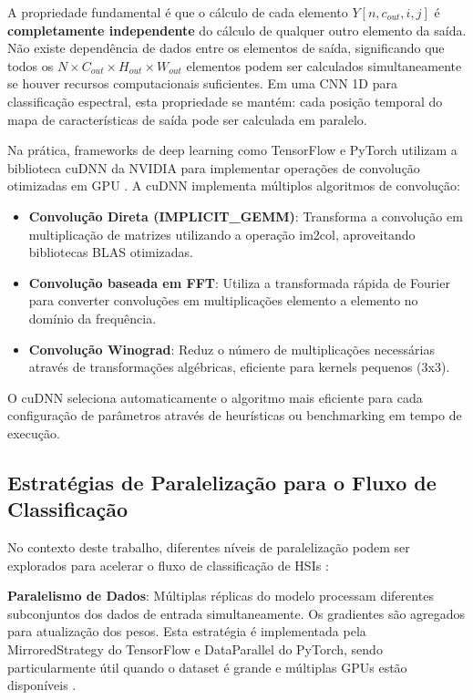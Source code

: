 A propriedade fundamental é que o cálculo de cada elemento $Y[n, c_{out}, i, j]$ é \textbf{completamente independente} do cálculo de qualquer outro elemento da saída. Não existe dependência de dados entre os elementos de saída, significando que todos os $N \times C_{out} \times H_{out} \times W_{out}$ elementos podem ser calculados simultaneamente se houver recursos computacionais suficientes. Em uma CNN 1D para classificação espectral, esta propriedade se mantém: cada posição temporal do mapa de características de saída pode ser calculada em paralelo.

Na prática, frameworks de deep learning como TensorFlow e PyTorch utilizam a biblioteca cuDNN da NVIDIA para implementar operações de convolução otimizadas em GPU \cite{Jorda_cuDNN}. A cuDNN implementa múltiplos algoritmos de convolução:

\begin{itemize}
    \item \textbf{Convolução Direta (IMPLICIT\_GEMM)}: Transforma a convolução em multiplicação de matrizes utilizando a operação im2col, aproveitando bibliotecas BLAS otimizadas.
    \item \textbf{Convolução baseada em FFT}: Utiliza a transformada rápida de Fourier para converter convoluções em multiplicações elemento a elemento no domínio da frequência.
    \item \textbf{Convolução Winograd}: Reduz o número de multiplicações necessárias através de transformações algébricas, eficiente para kernels pequenos (3x3).
\end{itemize}

O cuDNN seleciona automaticamente o algoritmo mais eficiente para cada configuração de parâmetros através de heurísticas ou benchmarking em tempo de execução.

\subsection{Estratégias de Paralelização para o Fluxo de Classificação}

No contexto deste trabalho, diferentes níveis de paralelização podem ser explorados para acelerar o fluxo de classificação de HSIs \cite{Aach2025, Nandan10910577}:

\textbf{Paralelismo de Dados}: Múltiplas réplicas do modelo processam diferentes subconjuntos dos dados de entrada simultaneamente. Os gradientes são agregados para atualização dos pesos. Esta estratégia é implementada pela MirroredStrategy do TensorFlow e DataParallel do PyTorch, sendo particularmente útil quando o dataset é grande e múltiplas GPUs estão disponíveis \cite{Nandan10910577}.


